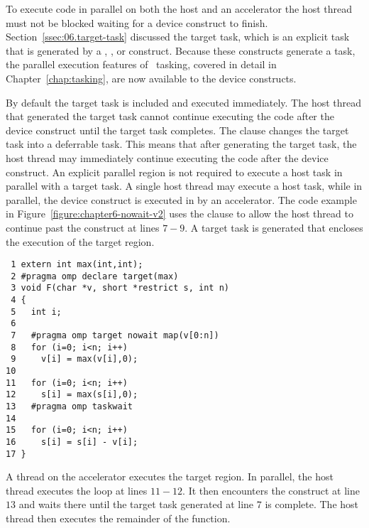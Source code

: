 To execute code in parallel on both the host and an
accelerator the host thread must not be blocked waiting for a
device construct to finish.  Section~\ref{ssec:06.target-task} discussed the
target task, which is an explicit task that is generated by a ,
,  or 
construct.  Because these constructs generate a task, the parallel execution
features of \OMP\ tasking, covered in detail in Chapter~\ref{chap:tasking}, are
now available to the device constructs.

By default the target task is included and executed immediately.  The host
thread that generated the target task cannot continue executing the code after
the device construct until the target task completes.  The  clause
changes the target task into a deferrable task.  This means that after
generating the target task, the host thread may immediately continue executing
the code after the device construct.  An explicit parallel region is not
required to execute a host task in parallel with a target task.  A single host
thread may execute a host task, while in parallel, the device construct is executed in
by an accelerator.  The code example in
Figure~\ref{figure:chapter6-nowait-v2} uses the  clause to allow the
host thread to continue past the  construct at lines $7-9$.  A
target task is generated that encloses the execution of the target region.

\begin{figure*}[!tb]
\begin{verbatim}
 1 extern int max(int,int);
 2 #pragma omp declare target(max)
 3 void F(char *v, short *restrict s, int n)
 4 {
 5   int i;
 6 
 7   #pragma omp target nowait map(v[0:n])
 8   for (i=0; i<n; i++)
 9     v[i] = max(v[i],0);
10 
11   for (i=0; i<n; i++)
12     s[i] = max(s[i],0);
13   #pragma omp taskwait
14 
15   for (i=0; i<n; i++)
16     s[i] = s[i] - v[i];
17 }
\end{verbatim}
\caption{ \textbf {Example using the nowait clause } -- \small
          Execute the target region on an accelerator in 
          parallel with the code executing on the host.
         }
\label{figure:chapter6-nowait-v2}
\end{figure*}

A thread on the accelerator executes the target region.  In parallel, the host
thread executes the loop at lines $11-12$.  It then encounters the
 construct at line $13$ and waits there until the target task
generated at line $7$ is complete.  The host thread then executes the
remainder of the function.


